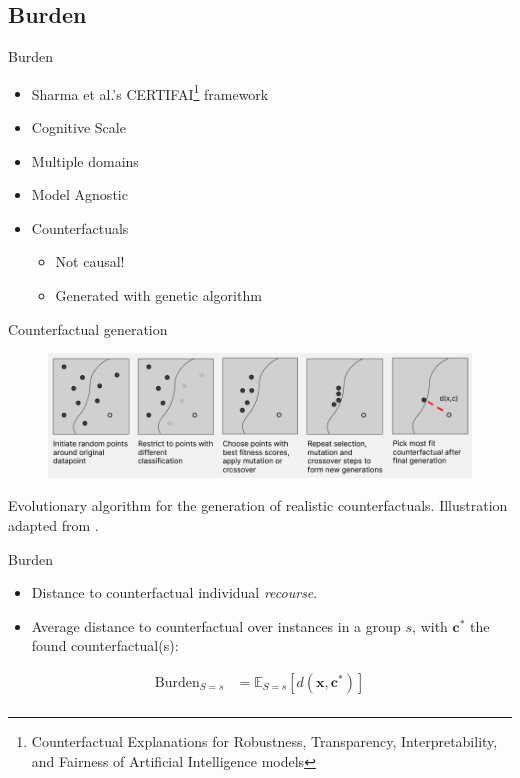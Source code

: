 \documentclass[aspectratio=169]{beamer}
\begin{document}
\subsection{Burden}

\begin{frame}{Burden}
    \begin{itemize}
        \item Sharma et al.'s CERTIFAI\footnote{Counterfactual Explanations for
            Robustness, Transparency, Interpretability, and Fairness of
            Artificial Intelligence models} framework \cite{certifai}
        \item Cognitive Scale
        \item Multiple domains
        \item Model Agnostic
        \item Counterfactuals
        \begin{itemize}
            \item \alert{Not causal!}
            \item Generated with genetic algorithm
        \end{itemize}
    \end{itemize}
\end{frame}

\begin{frame}{Counterfactual generation}
    \begin{figure}
    \centering
    \includegraphics[width=\textwidth]{img/counterfactual_generation_burden.png}
    \end{figure}
    Evolutionary algorithm for the generation of realistic counterfactuals.
    Illustration adapted from \cite{certifai}.
\end{frame}

\begin{frame}{Burden}
    \begin{itemize}
        \item Distance to counterfactual \textrightarrow individual \emph{recourse}.
        \item Average distance to counterfactual over instances in a group $s$,
            with $\mathbf{c^*}$ the found counterfactual(s):
    \end{itemize}
    \begin{align*}\label{eq:burden}
        \text{Burden}_{S=s} &= \mathbb{E}_{S=s}[d(\mathbf{x}, \mathbf{c^*})] \\
    \end{align*}
\end{frame}
\end{document}
